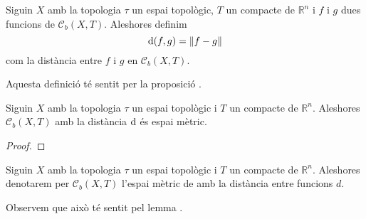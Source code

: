 \documentclass[../Apunts.tex]{subfiles}
\begin{document}
	\begin{definition}
		\label{def:distància entre funcions acotades}
		Siguin \(X\) amb la topologia \(\tau\) un espai topològic, \(T\) un compacte de \(\mathbb{R}^{n}\) i \(f\) i \(g\) dues funcions de \(\mathcal{C}_{b}(X,T)\). Aleshores definim
		\[\distancia(f,g)=\norm{f-g}\]
		com la distància entre \(f\) i \(g\) en \(\mathcal{C}_{b}(X,T)\).
		
		Aquesta definició té sentit per la proposició .
	\end{definition}
	\begin{lemma}
		\label{thm:l'espai de funcions contínues i acotades és un espai mètric}
		Siguin \(X\) amb la topologia \(\tau\) un espai topològic i \(T\) un compacte de \(\mathbb{R}^{n}\). Aleshores \(\mathcal{C}_{b}(X,T)\) amb la distància \(\operatorname{d}\) és espai mètric.
		\begin{proof}
		\end{proof}
	\end{lemma}
	\begin{notation}
		Siguin \(X\) amb la topologia \(\tau\) un espai topològic i \(T\) un compacte de \(\mathbb{R}^{n}\). Aleshores denotarem per \(\mathcal{C}_{b}(X,T)\) l'espai mètric de amb la distància entre funcions \(d\).
		
		Observem que això té sentit pel lemma .
	\end{notation}
\end{document}
